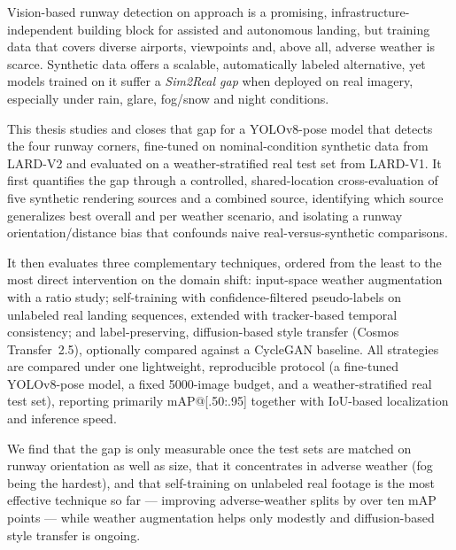 Vision-based runway detection on approach is a promising, infrastructure-independent
building block for assisted and autonomous landing, but training data that covers
diverse airports, viewpoints and, above all, adverse weather is scarce. Synthetic
data offers a scalable, automatically labeled alternative, yet models trained on it
suffer a \emph{Sim2Real gap} when deployed on real imagery, especially under rain,
glare, fog/snow and night conditions.

This thesis studies and closes that gap for a YOLOv8-pose model that detects the four
runway corners, fine-tuned on nominal-condition synthetic data from LARD-V2 and
evaluated on a weather-stratified real test set from LARD-V1. It first quantifies the
gap through a controlled, shared-location cross-evaluation of five synthetic rendering
sources and a combined source, identifying which source generalizes best overall and
per weather scenario, and isolating a runway orientation/distance bias that
confounds naive real-versus-synthetic comparisons.

It then evaluates three complementary techniques, ordered from the least to the most
direct intervention on the domain shift: input-space weather augmentation with a
ratio study; self-training with confidence-filtered pseudo-labels on unlabeled real
landing sequences, extended with tracker-based temporal consistency; and
label-preserving, diffusion-based style transfer (Cosmos Transfer~2.5), optionally
compared against a CycleGAN baseline. All strategies are compared under one
lightweight, reproducible protocol (a fine-tuned YOLOv8-pose model, a fixed
5000-image budget, and a weather-stratified real test set), reporting primarily
mAP@[.50:.95] together with IoU-based localization and inference speed.

We find that the gap is only measurable once the test sets are matched on runway
orientation as well as size, that it concentrates in adverse weather (fog being the
hardest), and that self-training on unlabeled real footage is the most effective
technique so far --- improving adverse-weather splits by over ten mAP points --- while
weather augmentation helps only modestly and diffusion-based style transfer is ongoing.
